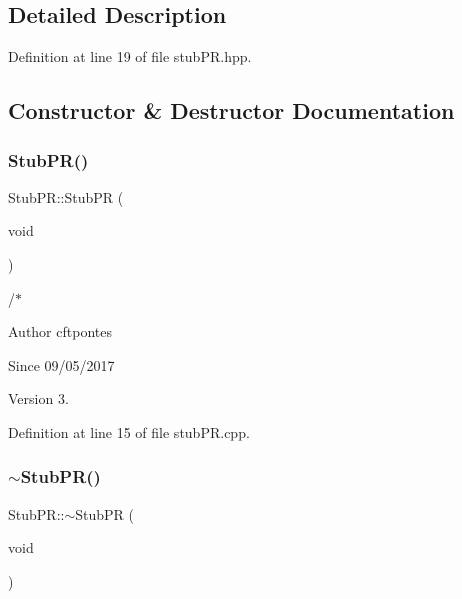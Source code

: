 \subsection{Detailed Description}


Definition at line 19 of file stub\+P\+R.\+hpp.



\subsection{Constructor \& Destructor Documentation}
\mbox{\label{class_stub_p_r_a422b75cc6a8e871a498e9d72fb7dc499}} 
\subsubsection{\texorpdfstring{Stub\+P\+R()}{StubPR()}}
{\footnotesize\ttfamily Stub\+P\+R\+::\+Stub\+PR (\begin{DoxyParamCaption}\item[{void}]{ }\end{DoxyParamCaption})}



/$\ast$ 

\begin{DoxyAuthor}{Author}
cftpontes 
\end{DoxyAuthor}
\begin{DoxySince}{Since}
09/05/2017 
\end{DoxySince}
\begin{DoxyVersion}{Version}
3. 
\end{DoxyVersion}


Definition at line 15 of file stub\+P\+R.\+cpp.

\mbox{\label{class_stub_p_r_a7b4922deef97a21ae44ad91df316c51e}} 
\subsubsection{\texorpdfstring{$\sim$\+Stub\+P\+R()}{~StubPR()}}
{\footnotesize\ttfamily Stub\+P\+R\+::$\sim$\+Stub\+PR (\begin{DoxyParamCaption}\item[{void}]{ }\end{DoxyParamCaption})}



